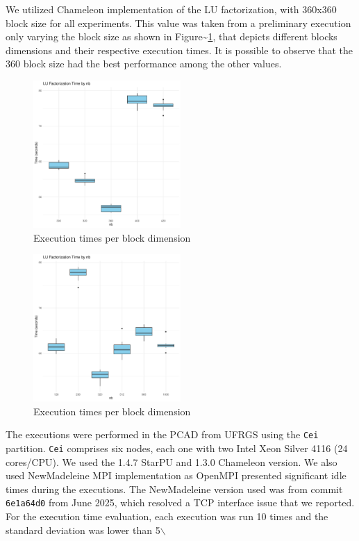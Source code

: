 \documentclass[conference, 10pt, final]{IEEEtran}
\begin{document}
We utilized Chameleon \cite{agullo:inria-00547847} implementation of the LU factorization, with 360x360 block size for all experiments. This value was taken from a preliminary execution only varying the block size as shown in Figure\textasciitilde{}\ref{fig:timeBlocks}, that depicts different blocks dimensions and their respective execution times. It is possible to observe that the 360 block size had the best performance among the other values.

\begin{figure}[ht]
\centering
\includegraphics[width=0.5\textwidth]{block-def.pdf}
\caption{Execution times per block dimension}
\label{fig:timeBlocks}
\end{figure}

\begin{figure}[ht]
\centering
\includegraphics[width=0.5\textwidth]{block-size.pdf}
\caption{Execution times per block dimension}
\label{fig:block-size}
\end{figure}


The executions were performed in the PCAD from UFRGS using the \verb|Cei| partition. \verb|Cei| comprises six nodes, each one with two Intel Xeon Silver 4116 (24 cores/CPU). We used the 1.4.7 StarPU and 1.3.0 Chameleon version. We also used NewMadeleine \cite{aumage2007new} MPI implementation as OpenMPI \cite{gabriel2004open} presented significant idle times during the executions. The NewMadeleine version used was from commit \verb|6e1a64d0| from June 2025, which resolved a TCP interface issue that we reported. For the execution time evaluation, each execution was run 10 times and the standard deviation was lower than 5$\backslash$%
\end{document}
